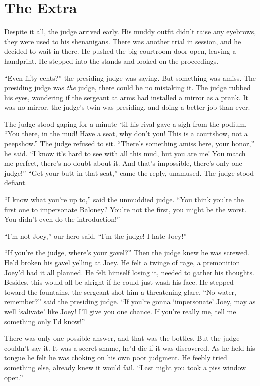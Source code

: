 \documentclass[oneside]{book}
\begin{document}
\chapter{The Extra}


Despite it all, the judge arrived early.  His muddy outfit didn't raise any eyebrows,
they were used to his shenanigans.  There was another trial in session, and he decided to wait in there.
He pushed the big courtroom door open, leaving a handprint.  He stepped into the stands and
looked on the proceedings.

``Even fifty cents?'' the presiding judge was saying.  But something was amiss.
The presiding judge was \emph{the} judge, there could be no mistaking it.  The judge rubbed his
eyes, wondering if the sergeant at arms had installed a mirror as a prank.
It was no mirror, the judge's twin was presiding, and doing a better job
than ever.

The judge stood gaping for a minute `til his rival gave a sigh from the podium.
``You there, in the mud!  Have a seat, why don't you!  This is a courtshow, not a peepshow.''
The judge refused to sit.  ``There's something amiss here, your honor,'' he said.  ``I know it's
hard to see with all this mud, but you are me!  You match me perfect, there's no doubt about it.
And that's impossible, there's only one judge!''  ``Get your butt in that seat,''
came the reply, unamused.  The judge stood defiant.

``I know what you're up to,'' said the unmuddied judge.  ``You think you're the first one to
impersonate Baloney?  You're not the first, you might be the worst.  You didn't even
do the introduction!''

``I'm not Joey,'' our hero said, ``I'm the judge!  I hate Joey!''

``If you're the judge, where's your gavel?''  Then the judge knew he was screwed.  He'd broken his
gavel yelling at Joey.  He felt a twinge of rage, a premonition Joey'd had it all planned.
He felt himself losing it, needed to gather his thoughts.  Besides, this would all be alright if
he could just wash his face.  He stepped toward the fountains, the
sergeant shot him a threatening glare.  ``No water, remember?'' said the presiding judge.  ``If you're gonna
`impersonate' Joey, may as well `salivate' like Joey!  I'll give you one chance.  If you're really me, tell me
something only I'd know!''

There was only one possible answer, and that was the bottles.  But the judge couldn't say it.
It was a secret shame, he'd die if it was discovered.  As he held his tongue he felt he was
choking on his own poor judgment.  He feebly tried something else, already knew it would fail.
``Last night you took a piss window open.''
\end{document}
